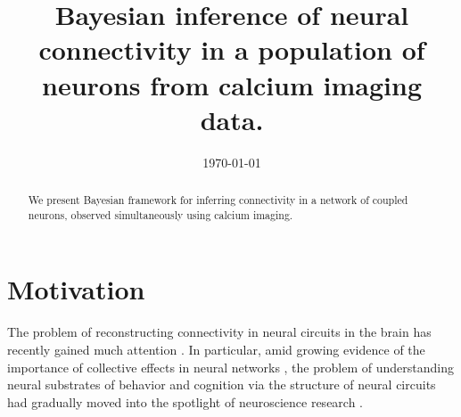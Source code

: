 \documentclass[amsmath,amssymb]{revtex4}
\begin{document}
\date{\today}
\title{Bayesian inference of neural connectivity in a population of neurons from 
calcium imaging data.}
\begin{abstract}
We present Bayesian framework for inferring connectivity in a network
of coupled neurons, observed simultaneously using calcium imaging.
\end{abstract}
\maketitle

\section{\label{sec1}Motivation}
The problem of reconstructing connectivity in neural circuits in the brain has recently gained much attention \cite{Hagmann2008,Hagmann2007,Helmstaedter2009,DenkHorstmann04,Briggman2006,Ikegaya2005}. In particular, amid growing evidence of the importance of collective effects in neural networks \cite{Rabinovich2008,Broome2006,Jones2007}, the problem of understanding neural substrates of behavior and cognition via the structure of neural circuits had gradually moved into the spotlight of neuroscience research \cite{Averbeck2008,deBono2005,Song2005,Dunn2004,Chalasani2007,Gray2005,rswormatlas,White1986}.
\end{document}
